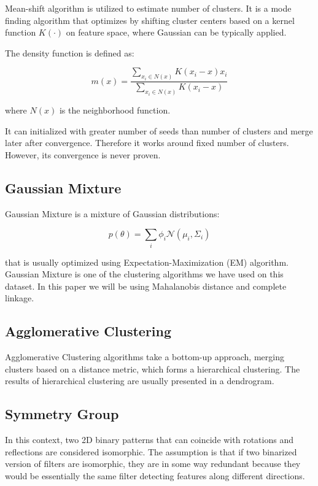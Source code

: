 \documentclass{article} %
\begin{document}
Mean-shift algorithm is utilized to estimate number of clusters. It is a mode finding algorithm that optimizes by shifting cluster centers based on a kernel function $K(\cdot)$ on feature space, where Gaussian can be typically applied.

The density function is defined as:

\begin{equation}
m(x) = \frac{\sum_{x_i \in N(x)}{K(x_i - x) x_i}}{\sum_{x_i \in N(x)}{K(x_i - x)}}
\end{equation}

where $N(x)$ is the neighborhood function.

It can initialized with greater number of seeds than number of clusters and merge later after convergence.
Therefore it works around fixed number of clusters.
However, its convergence is never proven.

\subsection{Gaussian Mixture}

Gaussian Mixture is a mixture of Gaussian distributions:

\begin{equation}
p(\theta) = \sum _i {\phi_i \mathcal{N}(\mu_i, \Sigma_i)}
\end{equation}

that is usually optimized using Expectation-Maximization (EM) algorithm.
Gaussian Mixture is one of the clustering algorithms we have used on this dataset.
In this paper we will be using Mahalanobis distance and complete linkage.

\subsection{Agglomerative Clustering}

Agglomerative Clustering algorithms take a bottom-up approach, merging clusters based on a distance metric, which forms a hierarchical clustering. The results of hierarchical clustering are usually presented in a dendrogram.

\subsection{Symmetry Group}

In this context, two 2D binary patterns that can coincide with rotations and reflections are considered isomorphic. The assumption is that if two binarized version of filters are isomorphic, they are in some way redundant because they would be essentially the same filter detecting features along different directions.
\end{document}
